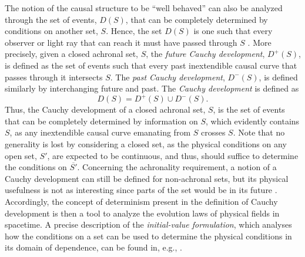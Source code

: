 \documentclass[
12pt,		%
openright,	%
twoside,  %
a4paper,			%
chapter=TITLE,		%
english,			%
french,				%
spanish,			%
brazil				%
]{USPSC-classe/USPSC}
\begin{document}
The notion of the causal structure to be ``well behaved'' can also be analyzed through the set of events, $D(S)$, that can be completely determined by conditions on another set, $S$. Hence, the set $D(S)$ is one such that every observer or light ray that can reach it must have passed through $S$ \cite{Geroch1970}. More precisely, given a closed achronal set, $S$, the \textit{future Cauchy development}, $D^+(S)$, is defined as the set of events such that every past inextendible causal curve that passes through it intersects $S$. The \textit{past Cauchy development}, $D^-(S)$, is defined similarly by interchanging future and past. The \textit{Cauchy development} is defined as
\begin{equation}
    D(S)=D^+(S)\cup D^-(S).
\end{equation}
Thus, the Cauchy development of a closed achronal set, $S$, is the set of events that can be completely determined by information on $S$, which evidently contains $S$, as any inextendible causal curve emanating from $S$ crosses $S$. Note that no generality is lost by considering a closed set, as the physical conditions on any open set, $S'$, are expected to be continuous, and thus, should suffice to determine the conditions on $\overline{S'}$. Concerning the achronality requirement, a notion of a Cauchy development can still be defined for non-achronal sets, but its physical usefulness is not as interesting since parts of the set would be in its future \cite{Penrose1972}. Accordingly, the concept of determinism present in the definition of Cauchy development is then a tool to analyze the evolution laws of physical fields in spacetime. A precise description of the \textit{initial-value formulation}, which analyses how the conditions on a set can be used to determine the physical conditions in its domain of dependence, can be found in, e.g., \cite{Wald1984}. 
\end{document}
